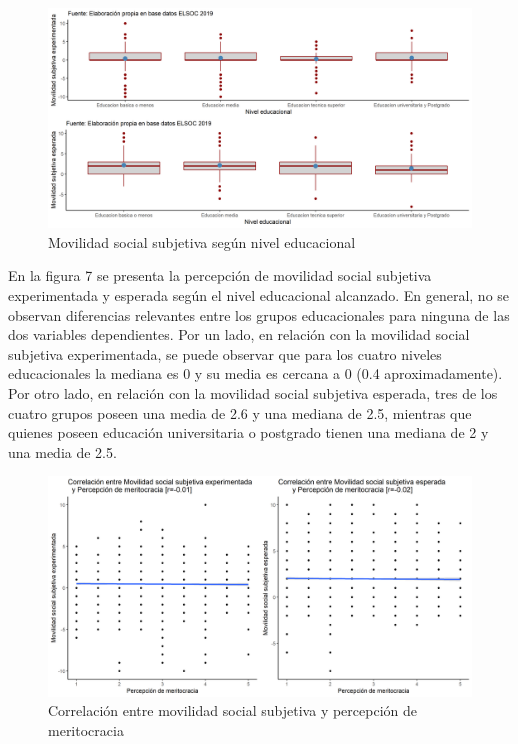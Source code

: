 \documentclass[
]{article}
\begin{document}
\begin{figure}

{\centering \includegraphics[width=1\linewidth,height=1\textheight]{output/graphs/graf3y4} 

}

\caption{Movilidad social subjetiva según nivel educacional}\label{fig:unnamed-chunk-12}
\end{figure}

En la figura 7 se presenta la percepción de movilidad social subjetiva
experimentada y esperada según el nivel educacional alcanzado. En
general, no se observan diferencias relevantes entre los grupos
educacionales para ninguna de las dos variables dependientes. Por un
lado, en relación con la movilidad social subjetiva experimentada, se
puede observar que para los cuatro niveles educacionales la mediana es 0
y su media es cercana a 0 (0.4 aproximadamente). Por otro lado, en
relación con la movilidad social subjetiva esperada, tres de los cuatro
grupos poseen una media de 2.6 y una mediana de 2.5, mientras que
quienes poseen educación universitaria o postgrado tienen una mediana de
2 y una media de 2.5.

\begin{figure}

{\centering \includegraphics[width=1\linewidth,height=1\textheight]{output/graphs/graf6y7} 

}

\caption{Correlación entre movilidad social subjetiva y percepción de meritocracia}\label{fig:unnamed-chunk-13}
\end{figure}
\end{document}
